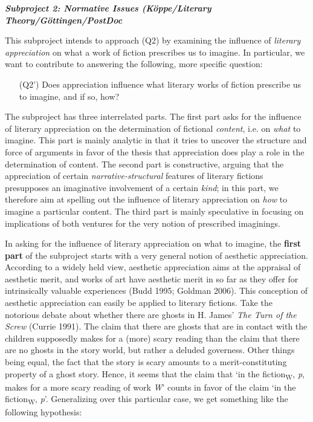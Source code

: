 
\vspace{.2cm}
\noindent\textbf{\emph{Subproject 2: Normative Issues (K\"oppe/Literary Theory/G\"ottingen/PostDoc}}
\vspace{.1cm}

\noindent This subproject intends to approach (Q2) by examining the influence of \emph{literary appreciation} on what a work of fiction prescribes us to imagine. In particular, we want to contribute to answering the following, more specific question:

\vspace{-.1cm}
\begin{itemize}[leftmargin=2cm]
\item[(Q2')] Does appreciation influence what literary works of fiction prescribe us to imagine, and if so, how?
\end{itemize}
\vspace{-.1cm}

\noindent The subproject has three interrelated parts. The first part asks for the influence of literary appreciation on the determination of fictional \emph{content}, i.e. on \emph{what} to imagine. This part is mainly analytic in that it tries to uncover the structure and force of arguments in favor of the thesis that appreciation does play a role in the determination of content. The second part is constructive, arguing that the appreciation of certain \emph{narrative-structural} features of literary fictions presupposes an imaginative involvement of a certain \emph{kind}; in this part, we therefore aim at spelling out the influence of literary appreciation on \emph{how} to imagine a particular content. The third part is mainly speculative in focusing on implications of both ventures for the very notion of prescribed imaginings.

In asking for the influence of literary appreciation on what to imagine, the \textbf{first part} of the subproject starts with a very general notion of aesthetic appreciation. According to a widely held view, aesthetic appreciation aims at the appraisal of aesthetic merit, and works of art have aesthetic merit in so far as they offer for intrinsically valuable experiences (Budd 1995; Goldman 2006). This conception of aesthetic appreciation can easily be applied to literary fictions. Take the notorious debate about whether there are ghosts in H. James' \emph{The Turn of the Screw} (Currie 1991). The claim that there are ghosts that are in contact with the children supposedly makes for a (more) scary reading than the claim that there are no ghosts in the story world, but rather a deluded governess. Other things being equal, the fact that the story is scary amounts to a merit-constituting property of a ghost story. Hence, it seems that the claim that `in the fiction\textsubscript{W}, \emph{p}, makes for a more scary reading of work \emph{W}' counts in favor of the claim `in the fiction\textsubscript{W}, \emph{p}'. Generalizing over this particular case, we get something like the following hypothesis: 

